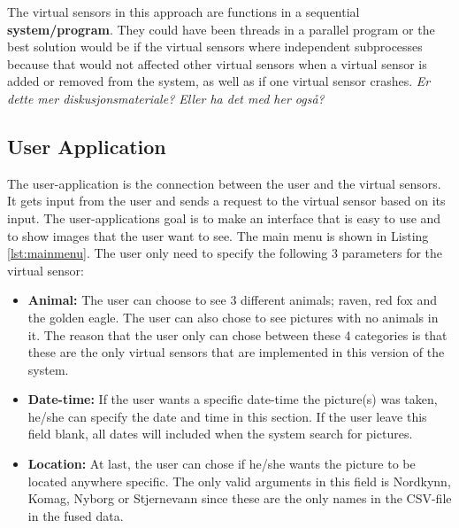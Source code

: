 \documentclass[USenglish]{uit-thesis}
\begin{document}
The virtual sensors in this approach are functions in a sequential \textbf{system/program}. They could have been threads in a parallel program or the best solution would be if the virtual sensors where independent subprocesses because that would not affected other virtual sensors when a virtual sensor is added or removed from the system, as well as if one virtual sensor crashes. \textit{Er dette mer diskusjonsmateriale? Eller ha det med her også?}



\subsection{User Application} \label{ssec:des_user}
The user-application is the connection between the user and the virtual sensors. It gets input from the user and sends a request to the virtual sensor based on its input. The user-applications goal is to make an interface that is easy to use and to show images that the user want to see. The main menu is shown in Listing \ref{lst:mainmenu}.
The user only need to specify the following 3 parameters for the virtual sensor:

\begin{itemize}
\item \textbf{Animal:} The user can choose to see 3 different animals; raven, red fox and the golden eagle. The user can also chose to see pictures with no animals in it. The reason that the user only can chose between these 4 categories is that these are the only virtual sensors that are implemented in this version of the system.

\item \textbf{Date-time:} If the user wants a specific date-time the picture(s) was taken, he/she can specify the date and time in this section. If the user leave this field blank, all dates will included when the system search for pictures.

\item \textbf{Location:} At last, the user can chose if he/she wants the picture to be located anywhere specific. The only valid arguments in this field is Nordkynn, Komag, Nyborg or Stjernevann since these are the only names in the CSV-file in the fused data.
\end{itemize}
\end{document}
